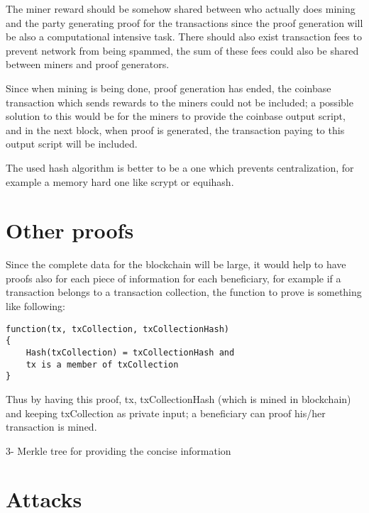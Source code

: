 \documentclass{article}
\begin{document}
The miner reward should be somehow shared between who actually does mining and the party generating proof for the transactions since the proof generation will be also a computational intensive task.
There should also exist transaction fees to prevent network from being spammed, the sum of these fees could also be shared between miners and proof generators.

Since when mining is being done, proof generation has ended, the coinbase transaction which sends rewards to the miners could not be included; a possible solution to this would be for the miners to provide the coinbase output script, and in the next block, when proof is generated, the transaction paying to this output script will be included.

The used hash algorithm is better to be a one which prevents centralization, for example a memory hard one like scrypt or equihash.

\section{Other proofs}

Since the complete data for the blockchain will be large, it would help to have proofs also for each piece of information for each beneficiary, for example if a transaction belongs to a transaction collection, the function to prove is something like following:

\begin{verbatim}
function(tx, txCollection, txCollectionHash)
{
	Hash(txCollection) = txCollectionHash and
	tx is a member of txCollection 
}
\end{verbatim}

Thus by having this proof, tx, txCollectionHash (which is mined in blockchain) and keeping txCollection as private input; a beneficiary can proof his/her transaction is mined.

3- Merkle tree for providing the concise information

\section{Attacks}
\end{document}
